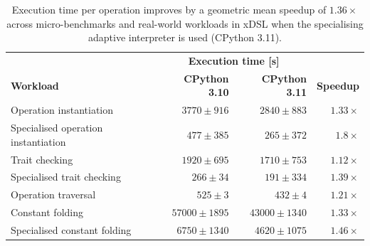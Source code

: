 \begin{table}[H]
  \caption{Execution time per operation improves by a geometric mean speedup of $1.36\times$ across micro-benchmarks and real-world workloads in xDSL when the specialising adaptive interpreter is used (CPython 3.11).}
  \label{tab:specialising-adaptive-interpreter-xdsl}
  \centering
  \begin{tabular}{lrrr}
    \toprule
    & \multicolumn{2}{c}{\textbf{Execution time [s]}} \\
    \cmidrule(r){2-3}
    \textbf{Workload}& \textbf{CPython 3.10} & \textbf{CPython 3.11} & \textbf{Speedup} \\
    \midrule
    Operation instantiation & $3770 \pm 916$ & $2840 \pm 883$ & $1.33\times$ \\
    Specialised operation instantiation & $477 \pm 385$ & $265 \pm 372$ & $1.8\times$ \\
    Trait checking & $1920 \pm 695$ & $1710 \pm 753$ & $1.12\times$ \\
    Specialised trait checking & $266 \pm 34$ & $191 \pm 334$ & $1.39\times$ \\
    Operation traversal & $525 \pm 3$ & $432 \pm 4$ & $1.21\times$ \\
    Constant folding & $57000 \pm 1895$ & $43000 \pm 1340$ & $1.33\times$ \\
    Specialised constant folding & $6750 \pm 1340$ & $4620 \pm 1075$ & $1.46\times$ \\
    \bottomrule
  \end{tabular}
\end{table}


